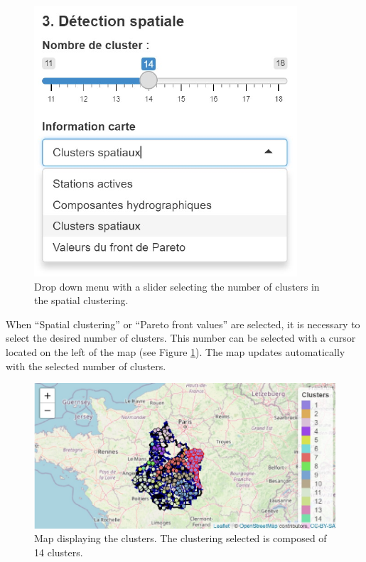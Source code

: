 \begin{figure}[htbp]
  \centering
  \includegraphics[]{figs/Chap6/Im_appbis.pdf}
  \caption{Drop down menu with a slider selecting the number of clusters in the spatial clustering.}
  \label{fig:Imapp}
\end{figure}   
   
When ``Spatial clustering'' or ``Pareto front values'' are selected, it is necessary to select the desired number of clusters. This number can be selected with a cursor located on the left of the map (see Figure \ref{fig:Imapp}). The map updates automatically with the selected number of clusters. 

\begin{figure}[htbp]
  \centering
  \includegraphics[]{figs/Chap6/Im_appbis6.pdf}
  \caption{Map displaying the clusters. The clustering selected is composed of 14 clusters.}
  \label{fig:Imapp6}
\end{figure}

